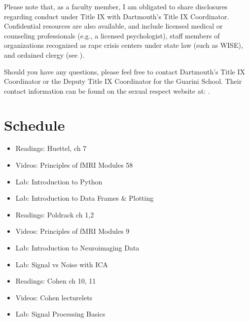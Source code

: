 \documentclass[letterpaper,10pt,english]{sphinxmanual}
\begin{document}
Please note that, as a faculty member, I am obligated to share disclosures regarding conduct under Title IX with Dartmouth’s Title IX Coordinator. Confidential resources are also available, and include licensed medical or counseling professionals (e.g., a licensed psychologist), staff members of organizations recognized as rape crisis centers under state law (such as WISE), and ordained clergy (see ).

Should you have any questions, please feel free to contact Dartmouth’s Title IX Coordinator or the Deputy Title IX Coordinator for the Guarini School. Their contact information can be found on the sexual respect website at: .


\section{Schedule}
\label{\detokenize{content/Schedule:schedule}}\label{\detokenize{content/Schedule::doc}}
\begin{itemize}
\item {} 
Readings: Huettel, ch 7

\item {} 
Videos: Principles of fMRI Modules 5\sphinxhyphen{}8

\item {} 
Lab: Introduction to Python

\item {} 
Lab: Introduction to Data Frames \& Plotting

\end{itemize}

\begin{itemize}
\item {} 
Readings: Poldrack ch 1,2

\item {} 
Videos: Principles of fMRI Modules 9

\item {} 
Lab: Introduction to Neuroimaging Data

\item {} 
Lab: Signal vs Noise with ICA

\end{itemize}

\begin{itemize}
\item {} 
Readings: Cohen ch 10, 11

\item {} 
Videos: Cohen lecturelets

\item {} 
Lab: Signal Processing Basics

\end{itemize}
\end{document}
